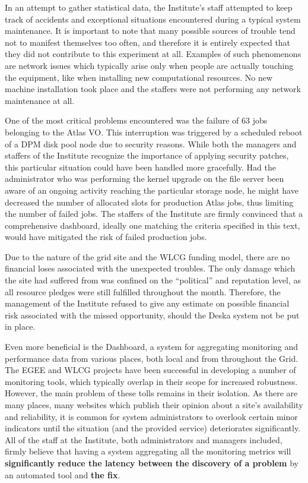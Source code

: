 \documentclass[12pt]{article}
\begin{document}
In an attempt to gather statistical data, the Institute's staff attempted to keep track of accidents and exceptional situations
encountered during a typical system maintenance.  It is important to note that many possible sources of trouble tend not to
manifest themselves too often, and therefore it is entirely expected that they did not contribute to this experiment at all.
Examples of such phenomenons are network issues which typically arise only when people are actually touching the equipment, like
when installing new computational resources.  No new machine installation took place and the staffers were not performing any
network maintenance at all.

One of the most critical problems encountered was the failure of 63 jobs belonging to the Atlas VO.  This interruption was
triggered by a scheduled reboot of a DPM disk pool node due to security reasons.  While both the managers and staffers of the
Institute recognize the importance of applying security patches, this particular situation could have been handled more
gracefully.  Had the administrator who was performing the kernel upgrade on the file server been aware of an ongoing activity
reaching the particular storage node, he might have decreased the number of allocated slots for production Atlas jobs, thus
limiting the number of failed jobs.  The staffers of the Institute are firmly convinced that a comprehensive dashboard, ideally
one matching the criteria specified in this text, would have mitigated the risk of failed production jobs.

Due to the nature of the grid site and the WLCG funding model, there are no financial loses associated with the unexpected
troubles.  The only damage which the site had suffered from was confined on the ``political'' and reputation level, as all
resource pledges were still fulfilled throughout the month.  Therefore, the management of the Institute refused to give any
estimate on possible financial risk associated with the missed opportunity, should the Deska system not be put in place.

Even more beneficial is the Dashboard, a system for aggregating monitoring and performance data from various places, both local
and from throughout the Grid.  The EGEE and WLCG projects have been successful in developing a number of monitoring tools, which
typically overlap in their scope for increased robustness.  However, the main problem of these tolls remains in their isolation.
As there are many places, many websites which publish their opinion about a site's availability and reliability, it is common for
system administrators to overlook certain minor indicators until the situation (and the provided service) deteriorates
significantly.  All of the staff at the Institute, both administrators and managers included, firmly believe that having a system
aggregating all the monitoring metrics will {\bf significantly reduce the latency between the discovery of a problem} by an
automated tool and {\bf the fix}.
\end{document}
